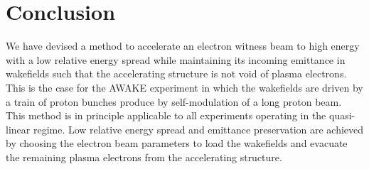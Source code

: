 \documentclass[aps,prstab,reprint,amsmath,amssymb,groupedaddress]{revtex4-1}
\newcommand{\unit}[1]{\,\mathrm{#1}}
\begin{document}
\section{Conclusion}\label{S:C}




We have devised a method to accelerate an electron witness beam to high energy with a low relative energy spread while
maintaining its incoming emittance in wakefields such that the accelerating structure is not void of plasma electrons.
This is the case for the AWAKE experiment in which the wakefields are driven by a train of proton bunches produce by
self-modulation of a long proton beam. This method is in principle applicable to all experiments operating in the
quasi-linear regime. Low relative energy spread and emittance preservation are achieved by choosing the electron beam
parameters to load the wakefields and evacuate the remaining plasma electrons from the accelerating structure.
 
\end{document}
